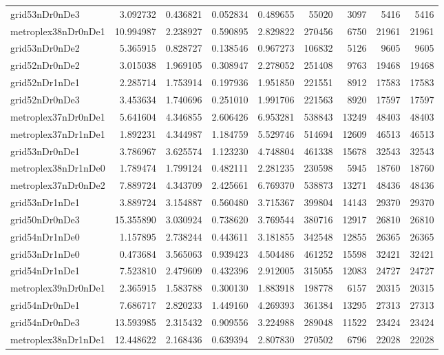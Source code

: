 \begin{longtable}{|l|r|r|r|r|r|r|r|r|}
grid53nDr0nDe3 & 3.092732 & 0.436821 & 0.052834 & 0.489655 & 55020 & 3097 & 5416 & 5416 \\
metroplex38nDr0nDe1 & 10.994987 & 2.238927 & 0.590895 & 2.829822 & 270456 & 6750 & 21961 & 21961 \\
grid53nDr0nDe2 & 5.365915 & 0.828727 & 0.138546 & 0.967273 & 106832 & 5126 & 9605 & 9605 \\
grid52nDr0nDe2 & 3.015038 & 1.969105 & 0.308947 & 2.278052 & 251408 & 9763 & 19468 & 19468 \\
grid52nDr1nDe1 & 2.285714 & 1.753914 & 0.197936 & 1.951850 & 221551 & 8912 & 17583 & 17583 \\
grid52nDr0nDe3 & 3.453634 & 1.740696 & 0.251010 & 1.991706 & 221563 & 8920 & 17597 & 17597 \\
metroplex37nDr0nDe1 & 5.641604 & 4.346855 & 2.606426 & 6.953281 & 538843 & 13249 & 48403 & 48403 \\
metroplex37nDr1nDe1 & 1.892231 & 4.344987 & 1.184759 & 5.529746 & 514694 & 12609 & 46513 & 46513 \\
grid53nDr0nDe1 & 3.786967 & 3.625574 & 1.123230 & 4.748804 & 461338 & 15678 & 32543 & 32543 \\
metroplex38nDr1nDe0 & 1.789474 & 1.799124 & 0.482111 & 2.281235 & 230598 & 5945 & 18760 & 18760 \\
metroplex37nDr0nDe2 & 7.889724 & 4.343709 & 2.425661 & 6.769370 & 538873 & 13271 & 48436 & 48436 \\
grid53nDr1nDe1 & 3.889724 & 3.154887 & 0.560480 & 3.715367 & 399804 & 14143 & 29370 & 29370 \\
grid50nDr0nDe3 & 15.355890 & 3.030924 & 0.738620 & 3.769544 & 380716 & 12917 & 26810 & 26810 \\
grid54nDr1nDe0 & 1.157895 & 2.738244 & 0.443611 & 3.181855 & 342548 & 12855 & 26365 & 26365 \\
grid53nDr1nDe0 & 0.473684 & 3.565063 & 0.939423 & 4.504486 & 461252 & 15598 & 32421 & 32421 \\
grid54nDr1nDe1 & 7.523810 & 2.479609 & 0.432396 & 2.912005 & 315055 & 12083 & 24727 & 24727 \\
metroplex39nDr0nDe1 & 2.365915 & 1.583788 & 0.300130 & 1.883918 & 198778 & 6157 & 20315 & 20315 \\
grid54nDr0nDe1 & 7.686717 & 2.820233 & 1.449160 & 4.269393 & 361384 & 13295 & 27313 & 27313 \\
grid54nDr0nDe3 & 13.593985 & 2.315432 & 0.909556 & 3.224988 & 289048 & 11522 & 23424 & 23424 \\
metroplex38nDr1nDe1 & 12.448622 & 2.168436 & 0.639394 & 2.807830 & 270502 & 6796 & 22028 & 22028 \\

\end{longtable}
